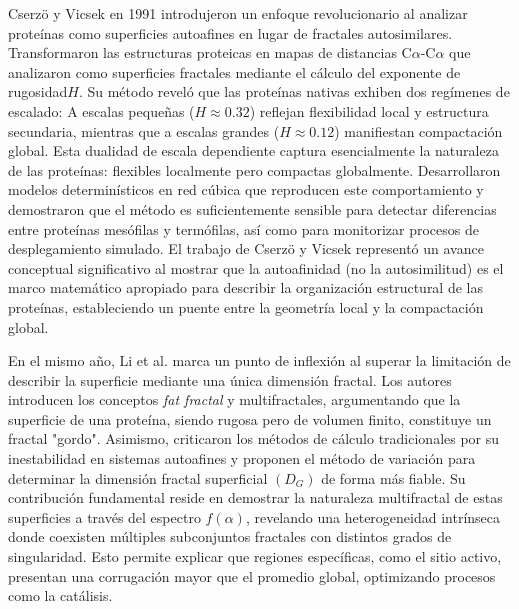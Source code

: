 Cserzö y Vicsek en 1991 \cite{Cserzo1991} introdujeron un enfoque revolucionario al analizar prote\'{i}nas como superficies autoafines en lugar de fractales autosimilares. Transformaron las estructuras proteicas en mapas de distancias C$\alpha$-C$\alpha$ que analizaron como superficies fractales mediante el c\'{a}lculo del exponente de rugosidad$H$. Su m\'{e}todo revel\'{o} que las prote\'{i}nas nativas exhiben dos reg\'{i}menes de escalado: A escalas pequeñas ($H \approx 0.32$) reflejan flexibilidad local y estructura secundaria, mientras que a escalas grandes ($H \approx 0.12$) manifiestan compactaci\'{o}n global. Esta dualidad de escala dependiente captura esencialmente la naturaleza de las prote\'{i}nas: flexibles localmente pero compactas globalmente. Desarrollaron modelos determin\'{i}sticos en red c\'{u}bica que reproducen este comportamiento y demostraron que el m\'{e}todo es suficientemente sensible para detectar diferencias entre prote\'{i}nas mes\'{o}filas y term\'{o}filas, as\'{i} como para monitorizar procesos de desplegamiento simulado. El trabajo de Cserzö y Vicsek represent\'{o} un avance conceptual significativo al mostrar que la autoafinidad (no la autosimilitud) es el marco matem\'{a}tico apropiado para describir la organizaci\'{o}n estructural de las prote\'{i}nas, estableciendo un puente entre la geometr\'{i}a local y la compactaci\'{o}n global.


En el mismo año, Li et al. \cite{HouqiangLi1991} marca un punto de inflexi\'{o}n al superar la limitaci\'{o}n de describir la superficie mediante una \'{u}nica dimensi\'{o}n fractal. Los autores introducen los conceptos \textit{fat fractal} y multifractales, argumentando que la superficie de una prote\'{i}na, siendo rugosa pero de volumen finito, constituye un fractal "gordo". Asimismo, criticaron los m\'{e}todos de c\'{a}lculo tradicionales por su inestabilidad en sistemas autoafines y proponen el m\'{e}todo de variaci\'{o}n para determinar la dimensi\'{o}n fractal superficial $(D_G)$ de forma m\'{a}s fiable. Su contribuci\'{o}n fundamental reside en demostrar la naturaleza multifractal de estas superficies a trav\'{e}s del espectro $f(\alpha)$, revelando una heterogeneidad intr\'{i}nseca donde coexisten m\'{u}ltiples subconjuntos fractales con distintos grados de singularidad. Esto permite explicar que regiones espec\'{i}ficas, como el sitio activo, presentan una corrugaci\'{o}n mayor que el promedio global, optimizando procesos como la cat\'{a}lisis. 

